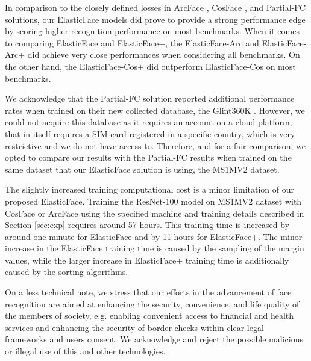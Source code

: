 \documentclass[letterpaper, 10 pt, conference]{ieeeconf}  \usepackage{times}
\begin{document}
In comparison to the closely defined losses in ArcFace \cite{deng2019arcface}, CosFace \cite{DBLP:conf/cvpr/WangWZJGZL018}, and Partial-FC  \cite{an2020partical_fc} solutions, our ElasticFace models did prove to provide a strong performance edge by scoring higher recognition performance on most benchmarks.
When it comes to comparing ElasticFace and ElasticFace+, the ElasticFace-Arc and ElasticFace-Arc+ did achieve very close performances when considering all benchmarks.
On the other hand, the ElasticFace-Cos+ did outperform  ElasticFace-Cos on most benchmarks.



We acknowledge that the Partial-FC \cite{an2020partical_fc} solution reported additional performance rates when trained on their new collected database, the Glint360K \cite{an2020partical_fc}. However, we could not acquire this database as it requires an account on a cloud platform, that in itself requires a SIM card registered in a specific country,  which is very restrictive and we do not have access to. Therefore, and for a fair comparison, we opted to compare our results with the Partial-FC results when trained on the same dataset that our ElasticFace solution is using, the MS1MV2 \cite{DBLP:conf/eccv/GuoZHHG16,deng2019arcface} dataset.

















The slightly increased training computational cost is a minor limitation of our proposed ElasticFace. Training the ResNet-100 model on MS1MV2 dataset with CosFace or ArcFace using the specified machine and training details described in Section \ref{sec:exp} requires around 57 hours.
This training time is increased by around one minute for ElasticFace and by 11 hours for ElasticFace+.
The minor increase in the ElasticFace training time is caused by the sampling of the margin values, while the larger increase in ElasticFace+ training time is additionally caused by the sorting algorithms.




On a less technical note, we stress that our efforts in the advancement of face recognition are aimed at enhancing the security, convenience, and life quality of the members of society,  e.g. enabling convenient access to financial and health services \cite{eadhaar} and enhancing the security of border checks within clear legal frameworks and users consent. We acknowledge and reject the possible malicious or illegal use of this and other technologies. 
\end{document}
